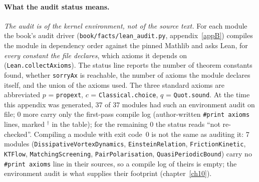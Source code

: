 \paragraph{What the audit status means.} \emph{The audit is of the kernel environment, not of the source text.} For each module the book's audit driver (\texttt{book/facts/lean\_audit.py}, appendix~\ref{appB}) compiles the module in dependency order against the pinned Mathlib and asks Lean, for \emph{every constant the file declares}, which axioms it depends on (\texttt{Lean.collectAxioms}). The status line reports the number of theorem constants found, whether \texttt{sorryAx} is reachable, the number of axioms the module declares itself, and the union of the axioms used. The three standard axioms are abbreviated $p$ = \texttt{propext}, $c$ = \texttt{Classical.choice}, $q$ = \texttt{Quot.sound}. At the time this appendix was generated, 37 of 37 modules had such an environment audit on file; 0 more carry only the first-pass compile log (author-written \texttt{\#print axioms} lines, marked $^\dagger$ in the table); for the remaining 0 the status reads ``not re-checked''. Compiling a module with exit code~0 is not the same as auditing it: 7 modules (\texttt{DissipativeVortexDynamics}, \texttt{EinsteinRelation}, \texttt{FrictionKinetic}, \texttt{KTFlow}, \texttt{MatchingScreening}, \texttt{PairPolarisation}, \texttt{QuasiPeriodicBound}) carry no \texttt{\#print axioms} line in their sources, so a compile log of theirs is empty; the environment audit is what supplies their footprint (chapter~\ref{ch10}).
